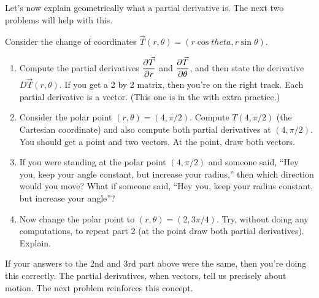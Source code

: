 Let's now explain geometrically what a partial derivative is. The next two problems will help with this.
\begin{problem}
 Consider the change of coordinates $\vec T(r,\theta) = (r\cos theta, r\sin \theta)$.
\begin{enumerate}
 \item Compute the partial derivatives $\displaystyle\frac{\partial \vec T}{\partial r}$ and $\displaystyle\frac{\partial \vec T}{\partial \theta}$, and then state the derivative $D\vec T(r,\theta)$. If you get a 2 by 2 matrix, then you're on the right track. Each partial derivative is a vector.  (This one is in the  with extra practice.)
 \item Consider the polar point $(r,\theta) = (4,\pi/2)$. Compute $T(4,\pi/2)$ (the Cartesian coordinate) and also compute both partial derivatives at $(4,\pi/2)$. You should get a point and two vectors.  At the point, draw both vectors.
 \item If you were standing at the polar point $(4,\pi/2)$ and someone said, ``Hey you, keep your angle constant, but increase your radius,'' then which direction would you move?  What if someone said, ``Hey you, keep your radius constant, but increase your angle''?
 \item Now change the polar point to $(r,\theta) = (2,3\pi/4)$.  Try, without doing  any computations, to repeat part 2 (at the point draw both partial derivatives). Explain.
\end{enumerate}
\end{problem}

If your answers to the 2nd and 3rd part above were the same, then you're doing this correctly.  The partial derivatives, when vectors, tell us precisely about motion. The next problem reinforces this concept.

